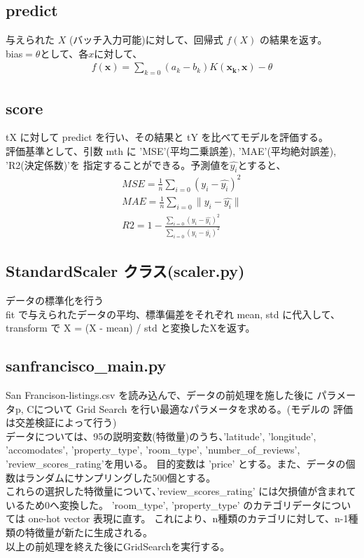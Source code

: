 \documentclass{jsarticle}
\begin{document}
\subsection*{predict}
与えられた $X$ (バッチ入力可能)に対して、回帰式 $f(X)$ の結果を返す。\\
bias$ = \theta$として、各$x$に対して、
\begin{eqnarray*}
f(\bm{x}) = \sum_{k=0} (a_k - b_k) K(\bm{x_k}, \bm{x}) - \theta
\end{eqnarray*}

\subsection*{score}
tX に対して predict を行い、その結果と tY を比べてモデルを評価する。\\
評価基準として、引数 mth に 'MSE'(平均二乗誤差), 'MAE'(平均絶対誤差), 'R2(決定係数)'を
指定することができる。予測値を$\hat{y_i}$とすると、
\begin{eqnarray*}
MSE = \frac{1}{n} \sum_{i=0} (y_i - \hat{y_i})^2 \\
MAE = \frac{1}{n} \sum_{i=0} \| y_i - \hat{y_i} \| \\
R2 = 1 - \frac{\sum_{i=0} (y_i - \hat{y_i})^2}{\sum_{i=0} (y_i - \bar{y_i})^2}
\end{eqnarray*}

\subsection*{StandardScaler クラス(scaler.py)}
データの標準化を行う \\
fit で与えられたデータの平均、標準偏差をそれぞれ mean, std に代入して、
transform で X = (X - mean) / std と変換したXを返す。

\subsection*{sanfrancisco\_main.py}
San Francison-listings.csv を読み込んで、データの前処理を施した後に
パラメータp, Cについて Grid Search を行い最適なパラメータを求める。(モデルの
評価は交差検証によって行う) \\
データについては、95の説明変数(特徴量)のうち、'latitude', 'longitude', 'accomodates', 'property\_type', 
'room\_type', 'number\_of\_reviews', 'review\_scores\_rating'を用いる。
目的変数は 'price' とする。また、データの個数はランダムにサンプリングした500個とする。 \\
これらの選択した特徴量について、'review\_scores\_rating' には欠損値が含まれているため0へ変換した。
'room\_type', 'property\_type' のカテゴリデータについては one-hot vector 表現に直す。
これにより、n種類のカテゴリに対して、n-1種類の特徴量が新たに生成される。\\
以上の前処理を終えた後にGridSearchを実行する。
\end{document}
